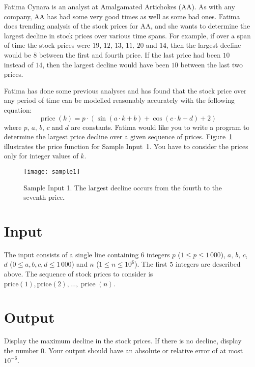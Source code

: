 
%
Fatima Cynara is an analyst at Amalgamated Artichokes (AA).  As with any
company, AA has had some very good times as well as some bad ones.
Fatima does trending analysis of the stock prices for AA, and she wants to
determine the largest decline in stock prices over various time spans.  For example, if over a span of time the stock
prices were $19$, $12$, $13$, $11$, $20$ and $14$, then the
largest decline would be $8$ between the first and fourth price.  If the last price
had been $10$ instead of $14$, then the largest decline would have
been $10$ between the last two prices.

Fatima has done some previous analyses and has found that the stock
price over any period of time can be modelled reasonably accurately
with the following equation:
\[
	\operatorname{price}(k) = p \cdot (\sin(a \cdot k+b) + \cos(c \cdot k+d) + 2)
\]
where $p$, $a$, $b$, $c$ and $d$ are constants.
Fatima would like you to
write a program to determine the largest price decline over a given sequence of prices.  Figure~\ref{fig:art fig} illustrates the price function for Sample Input~1.  You have to consider the prices only for integer values of $k$.

\begin{figure}[!h]
  \centering
  \texttt{[image: sample1]}
  \caption{Sample Input 1.  The largest decline occurs from the fourth to the seventh price.}
  \label{fig:art fig}
\end{figure}

\section*{Input}

The input consists of a single line containing $6$ integers $p$ ($1 \le p \le
1\,000$), $a$, $b$, $c$, $d$  ($0 \le a, b, c, d \le 1\,000$) and $n$ ($1 \le n \le 10^6$).
The first $5$ integers are described above.
The sequence of stock prices to consider is 
$\operatorname{price(1)}, \operatorname{price(2)}, \ldots,
\operatorname{price}(n)$.

\section*{Output}

Display the maximum decline in the stock prices.
If there is no decline, display the number $0$.
Your output should have an absolute or relative
error of at most $10^{-6}$.


